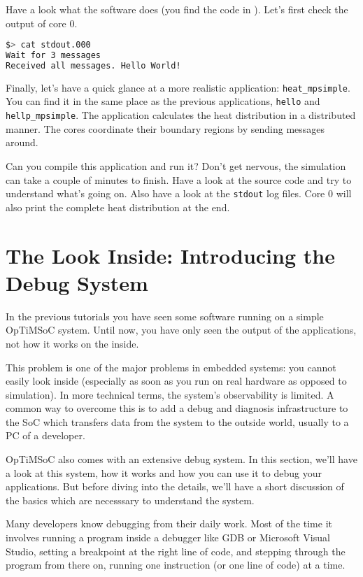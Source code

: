 Have a look what the software does (you find the code in
). Let's first
check the output of core 0.

\begin{lstlisting}[language=sh]
$> cat stdout.000
Wait for 3 messages
Received all messages. Hello World!
\end{lstlisting}

\vspace{2em}

Finally, let's have a quick glance at a more realistic application:
\verb|heat_mpsimple|. You can find it in the same place as the previous
applications, \verb|hello| and \verb|hellp_mpsimple|. The application
calculates the heat distribution in a distributed manner. The cores coordinate
their boundary regions by sending messages around.

Can you compile this application and run it? Don't get nervous, the simulation
can take a couple of minutes to finish. Have a look at the source code and try
to understand what's going on. Also have a look at the \verb|stdout| log files.
Core 0 will also print the complete heat distribution at the end.


\section{The Look Inside: Introducing the Debug System}

In the previous tutorials you have seen some software running on a simple
OpTiMSoC system. Until now, you have only seen the output of the applications,
not how it works on the inside.

This problem is one of the major problems in embedded systems: you cannot
easily look inside (especially as soon as you run on real hardware as opposed
to simulation). In more technical terms, the system's observability is
limited. A common way to overcome this is to add a debug and diagnosis
infrastructure to the SoC which transfers data from the system to the outside
world, usually to a PC of a developer.

OpTiMSoC also comes with an extensive debug system. In this section, we'll have
a look at this system, how it works and how you can use it to debug your
applications. But before diving into the details, we'll have a short discussion
of the basics which are necesssary to understand the system.

Many developers know debugging from their daily work. Most of the time it
involves running a program inside a debugger like GDB or Microsoft Visual
Studio, setting a breakpoint at the right line of code, and stepping through the
program from there on, running one instruction (or one line of code) at a time.


